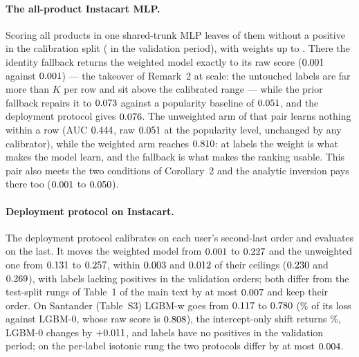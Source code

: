\documentclass[sigconf,nonacm]{acmart}
\newcommand{\Sm}{\textsf{LGBM-w}\xspace}
\newcommand{\Nm}{\textsf{LGBM-0}\xspace}
\begin{document}
\paragraph{The all-product Instacart MLP.} Scoring all \nIMAnLabels{} products in one shared-trunk MLP leaves \nIMASnDead{} of them without a positive in the calibration split (\nIMASnDeadVal{} in the validation period), with weights up to \nIMAwMax. There the identity fallback returns the weighted model exactly to its raw score ($0.001$ against $0.001$) --- the takeover of Remark~2 at scale: the untouched labels are far more than $K$ per row and sit above the calibrated range --- while the prior fallback repairs it to $0.073$ against a popularity baseline of $0.051$, and the deployment protocol gives $0.076$. The unweighted arm of that pair learns nothing within a row (AUC $0.444$, raw $0.051$ at the popularity level, unchanged by any calibrator), while the weighted arm reaches $0.810$: at \nIMAnLabels{} labels the weight is what makes the model learn, and the fallback is what makes the ranking usable. This pair also meets the two conditions of Corollary~2 and the analytic inversion pays there too ($0.001$ to $0.050$).

\paragraph{Deployment protocol on Instacart.} The deployment protocol calibrates on each user's second-last order and evaluates on the last. It moves the weighted model from $0.001$ to $0.227$ and the unweighted one from $0.131$ to $0.257$, within $0.003$ and $0.012$ of their ceilings ($0.230$ and $0.269$), with \ndepISnDeadVal{} labels lacking positives in the validation orders; both differ from the test-split rungs of Table~1 of the main text by at most $0.007$ and keep their order. On Santander (Table~S3) \Sm goes from $0.117$ to $0.780$ (\ndepSrepairShare\% of its loss against \Nm, whose raw score is $0.808$), the intercept-only shift returns \ndepSoffsetShare\%, \Nm changes by $+0.011$, and \ndepSnDeadVal{} labels have no positives in the validation period; on the per-label isotonic rung the two protocols differ by at most $0.004$.
\end{document}
